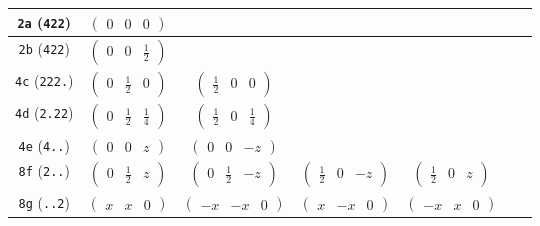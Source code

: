 \documentclass[fleqn,9pt,landscape]{jsarticle}
\begin{document}
\begin{center}
\begin{longtable}{ccccccc}
{\tt 2a} ({\tt 422}) & $ \begin{pmatrix} 0 & 0 & 0 \end{pmatrix} $ & $  $ & $  $ & $  $ & $  $ & $  $ \\ \hline
{\tt 2b} ({\tt 422}) & $ \begin{pmatrix} 0 & 0 & \frac{1}{2} \end{pmatrix} $ & $  $ & $  $ & $  $ & $  $ & $  $ \\ \hline
{\tt 4c} ({\tt 222.}) & $ \begin{pmatrix} 0 & \frac{1}{2} & 0 \end{pmatrix} $ & $ \begin{pmatrix} \frac{1}{2} & 0 & 0 \end{pmatrix} $ & $  $ & $  $ & $  $ & $  $ \\ \hline
{\tt 4d} ({\tt 2.22}) & $ \begin{pmatrix} 0 & \frac{1}{2} & \frac{1}{4} \end{pmatrix} $ & $ \begin{pmatrix} \frac{1}{2} & 0 & \frac{1}{4} \end{pmatrix} $ & $  $ & $  $ & $  $ & $  $ \\ \hline
{\tt 4e} ({\tt 4..}) & $ \begin{pmatrix} 0 & 0 & z \end{pmatrix} $ & $ \begin{pmatrix} 0 & 0 & - z \end{pmatrix} $ & $  $ & $  $ & $  $ & $  $ \\ \hline
{\tt 8f} ({\tt 2..}) & $ \begin{pmatrix} 0 & \frac{1}{2} & z \end{pmatrix} $ & $ \begin{pmatrix} 0 & \frac{1}{2} & - z \end{pmatrix} $ & $ \begin{pmatrix} \frac{1}{2} & 0 & - z \end{pmatrix} $ & $ \begin{pmatrix} \frac{1}{2} & 0 & z \end{pmatrix} $ & $  $ & $  $ \\ \hline
{\tt 8g} ({\tt ..2}) & $ \begin{pmatrix} x & x & 0 \end{pmatrix} $ & $ \begin{pmatrix} - x & - x & 0 \end{pmatrix} $ & $ \begin{pmatrix} x & - x & 0 \end{pmatrix} $ & $ \begin{pmatrix} - x & x & 0 \end{pmatrix} $ & $  $ & $  $ \\ \hline

\end{longtable}
\end{center}
\end{document}
